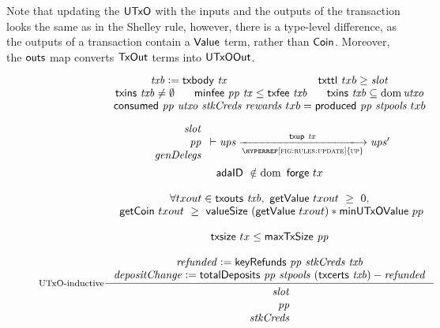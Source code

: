 Note that updating the $\mathsf{UTxO}$ with the inputs and the outputs of the transaction
looks the same as in the Shelley rule, however, there is a type-level difference, as
the outputs of a transaction contain a $\mathsf{Value}$ term, rather than
$\mathsf{Coin}$. Moreover, the $\mathsf{outs}$ map converts $\mathsf{TxOut}$ terms into $\mathsf{UTxOOut}$.


\begin{figure}[htb]
  \begin{equation}\label{eq:utxo-inductive-shelley}
    \inference[UTxO-inductive]
    { \var{txb}\leteq\txbody{tx}
      & \txttl txb \geq \var{slot}
      \\ \txins{txb} \neq \emptyset
      & \minfee{pp}{tx} \leq \txfee{txb}
      & \txins{txb} \subseteq \dom \var{utxo}
      \\
      \consumed{pp}{utxo}{stkCreds}{rewards}~{txb} = \produced{pp}{stpools}~{txb}
      \\
      ~
      \\
      {
        \begin{array}{r}
          \var{slot} \\
          \var{pp} \\
          \var{genDelegs} \\
        \end{array}
      }
      \vdash \var{ups} \trans{\hyperref[fig:rules:update]{up}}{\fun{txup}~\var{tx}} \var{ups'}
      \\
      ~
      \\
      \mathsf{adaID}~\notin \dom~{\fun{forge}~tx} \\
      ~\\
      \forall txout \in \txouts{txb}, ~ \fun{getValue}~txout  ~\geq ~ 0, \\~
      \fun{getCoin}~txout ~\geq ~\fun{valueSize}~(\fun{getValue}~txout) * \fun{minUTxOValue}~pp \\~
      \\
      \fun{txsize}~{tx}\leq\fun{maxTxSize}~\var{pp}
      \\
      ~
      \\
      \var{refunded} \leteq \keyRefunds{pp}{stkCreds}{txb}
      \\
      \var{depositChange} \leteq
        \totalDeposits{pp}{stpools}{(\txcerts{txb})} - \var{refunded}
    }
    {
      \begin{array}{r}
        \var{slot}\\
        \var{pp}\\
        \var{stkCreds}\\

\end{array}}
\end{equation}
\end{figure}
